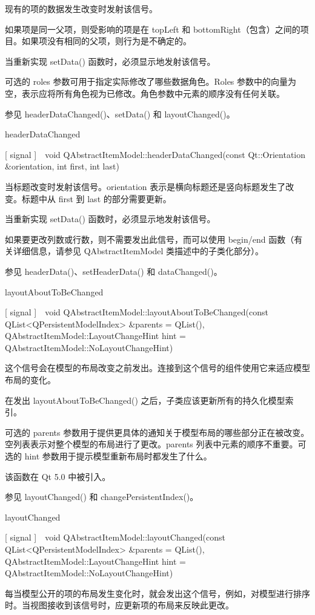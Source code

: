 现有的项的数据发生改变时发射该信号。

如果项是同一父项，则受影响的项是在 topLeft 和 bottomRight（包含）之间的项目。如果项没有相同的父项，则行为是不确定的。

当重新实现 setData() 函数时，必须显示地发射该信号。

可选的 roles 参数可用于指定实际修改了哪些数据角色。Roles 参数中的向量为空，表示应将所有角色视为已修改。角色参数中元素的顺序没有任何关联。

参见 headerDataChanged()、setData() 和 layoutChanged()。

headerDataChanged

[ signal ] void QAbstractItemModel::headerDataChanged(const Qt::Orientation \&orientation, int first, int last)

当标题改变时发射该信号。orientation 表示是横向标题还是竖向标题发生了改变。标题中从 first 到 last 的部分需要更新。

当重新实现 setData() 函数时，必须显示地发射该信号。

如果要更改列数或行数，则不需要发出此信号，而可以使用 begin/end 函数（有关详细信息，请参见 QAbstractItemModel 类描述中的子类化部分）。

参见 headerData()、setHeaderData() 和 dataChanged()。

layoutAboutToBeChanged

[ signal ] void QAbstractItemModel::layoutAboutToBeChanged(const QList<QPersistentModelIndex> \&parents = QList(), QAbstractItemModel::LayoutChangeHint hint = QAbstractItemModel::NoLayoutChangeHint)

这个信号会在模型的布局改变之前发出。连接到这个信号的组件使用它来适应模型布局的变化。

在发出 layoutAboutToBeChanged() 之后，子类应该更新所有的持久化模型索引。

可选的 parents 参数用于提供更具体的通知关于模型布局的哪些部分正在被改变。空列表表示对整个模型的布局进行了更改。parents 列表中元素的顺序不重要。可选的 hint 参数用于提示模型重新布局时都发生了什么。

该函数在 Qt 5.0 中被引入。

参见 layoutChanged() 和 changePersistentIndex()。

layoutChanged

[ signal ] void QAbstractItemModel::layoutChanged(const QList<QPersistentModelIndex> \&parents = QList(), QAbstractItemModel::LayoutChangeHint hint = QAbstractItemModel::NoLayoutChangeHint)

每当模型公开的项的布局发生变化时，就会发出这个信号，例如，对模型进行排序时。当视图接收到该信号时，应更新项的布局来反映此更改。

